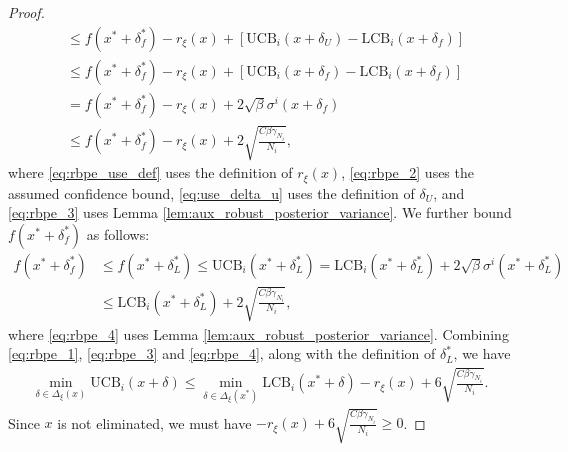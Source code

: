 \documentclass[10pt]{article}
\begin{document}
\begin{proof}
\begin{align}
        & \leq f(x^*+\delta^*_f) - r_{\xi}(x) + [\mathrm{UCB}_i(x+\delta_U) - \mathrm{LCB}_i(x+\delta_f)] \label{eq:rbpe_2} \\
        & \leq f(x^*+\delta^*_f) - r_{\xi}(x) + [\mathrm{UCB}_i(x+\delta_f) - \mathrm{LCB}_i(x+\delta_f)] \label{eq:use_delta_u} \\
        & = f(x^*+\delta^*_f) - r_{\xi}(x) + 2\sqrt{\beta}\sigma^i(x+\delta_f) \\
        & \leq f(x^*+\delta^*_f) - r_{\xi}(x) + 2\sqrt{\frac{C\beta\gamma_{N_i}}{N_i}} \label{eq:rbpe_3},
    \end{align}
    where \eqref{eq:rbpe_use_def} uses the definition of $r_\xi(x)$,
    \eqref{eq:rbpe_2} uses the assumed confidence bound, 
    \eqref{eq:use_delta_u} uses the definition of $\delta_U$,
    and \eqref{eq:rbpe_3} uses Lemma \ref{lem:aux_robust_posterior_variance}.
    We further bound $f(x^*+\delta^*_f)$ as follows:
    \begin{align}
        f(x^*+\delta^*_f)
        & \leq f(x^*+\delta^*_L)
        \leq \mathrm{UCB}_i(x^*+\delta^*_L)
        = \mathrm{LCB}_i(x^*+\delta^*_L) + 2\sqrt{\beta}\sigma^i(x^*+\delta^*_L) \\
        & \leq \mathrm{LCB}_i(x^*+\delta^*_L) + 2\sqrt{\frac{C\beta\gamma_{N_i}}{N_i}} \label{eq:rbpe_4},
    \end{align}
    where \eqref{eq:rbpe_4} uses Lemma \ref{lem:aux_robust_posterior_variance}.
    Combining \eqref{eq:rbpe_1}, \eqref{eq:rbpe_3} and \eqref{eq:rbpe_4}, along with the definition of $\delta^*_L$, we have
    \begin{align}
        \min_{\delta\in\Delta_{\xi}(x)} \mathrm{UCB}_i(x+\delta)
        \leq \min_{\delta\in\Delta_{\xi}(x^*)} \mathrm{LCB}_i(x^*+\delta) - r_{\xi}(x) + 6\sqrt{\frac{C\beta\gamma_{N_i}}{N_i}}.
    \end{align}
    Since $x$ is not eliminated, we must have $- r_{\xi}(x) + 6\sqrt{\frac{C\beta\gamma_{N_i}}{N_i}} \geq 0$.
\end{proof}
\end{document}
